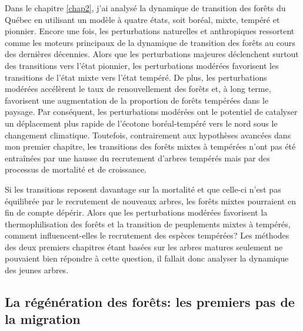 Dans le chapitre \ref{chap2}, j'ai analysé la dynamique de transition
des forêts du Québec en utilisant un modèle à quatre états, soit boréal,
mixte, tempéré et pionnier. Encore une fois, les perturbations
naturelles et anthropiques ressortent comme les moteurs principaux de la
dynamique de transition des forêts au cours des dernières décennies.
Alors que les perturbations majeures déclenchent surtout des transitions
vers l'état pionnier, les perturbations modérées favorisent les
transitions de l'état mixte vers l'état tempéré. De plus, les
perturbations modérées accélèrent le taux de renouvellement des forêts
et, à long terme, favorisent une augmentation de la proportion de forêts
tempérées dans le paysage. Par conséquent, les perturbations modérées
ont le potentiel de catalyser un déplacement plus rapide de l'écotone
boréal-tempéré vers le nord sous le changement climatique. Toutefois,
contrairement aux hypothèses avancées dans mon premier chapitre, les
transitions des forêts mixtes à tempérées n'ont pas été entraînées par
une hausse du recrutement d'arbres tempérés mais par des processus de
mortalité et de croissance.

Si les transitions reposent davantage sur la mortalité et que celle-ci
n'est pas équilibrée par le recrutement de nouveaux arbres, les forêts
mixtes pourraient en fin de compte dépérir. Alors que les perturbations
modérées favorisent la thermophilisation des forêts et la transition de
peuplements mixtes à tempérés, comment influencent-elles le recrutement
des espèces tempérées? Les méthodes des deux premiers chapitres étant
basées sur les arbres matures seulement ne pouvaient bien répondre à
cette question, il fallait donc analyser la dynamique des jeunes arbres.

\hypertarget{la-ruxe9guxe9nuxe9ration-des-foruxeats-les-premiers-pas-de-la-migration}{%
\subsection{La régénération des forêts: les premiers pas de la
migration}\label{la-ruxe9guxe9nuxe9ration-des-foruxeats-les-premiers-pas-de-la-migration}}

